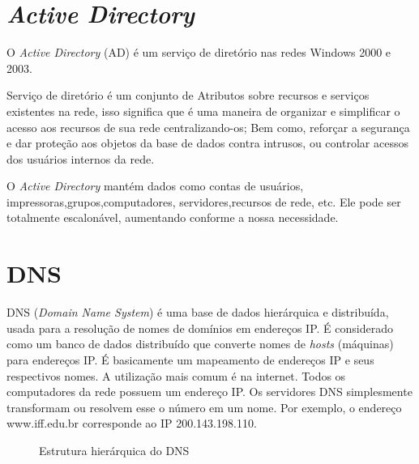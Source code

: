 
\section{\textit{Active Directory}}

O \textit{Active Directory} (AD) é um serviço de diretório nas redes Windows 2000 e 2003.

Serviço de diretório é um conjunto de Atributos sobre recursos e serviços existentes na rede, isso significa que é uma maneira de organizar e simplificar o acesso aos recursos de sua rede centralizando-os; Bem como, reforçar a segurança e dar proteção aos objetos da base de dados contra intrusos, ou controlar acessos dos usuários internos da rede.

O \textit{Active Directory} mantém dados como contas de usuários, impressoras,grupos,computadores, servidores,recursos de rede, etc. Ele pode ser totalmente escalonável, aumentando conforme a nossa necessidade.\cite{LOSANO}

\section{DNS}

DNS (\textit{Domain Name System}) é uma base de dados hierárquica e distribuída, usada para a resolução de nomes de domínios em endereços IP. É considerado como um banco de dados distribuído que converte nomes de \textit{hosts} (máquinas) para endereços IP. É basicamente um mapeamento de endereços IP e seus respectivos nomes. A utilização mais comum é na internet. Todos os computadores da rede possuem um endereço IP. Os servidores DNS simplesmente transformam ou resolvem esse o número em um nome. Por exemplo, o endereço www.iff.edu.br corresponde ao IP 200.143.198.110. \cite{SCRIMER}

\begin{figure}[ht]
   	\centering
   	\caption{Estrutura hierárquica do DNS \cite{SCRIMER}}
    \label{dns}
\end{figure}

